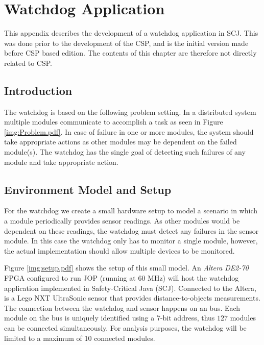 \chapter{Watchdog Application}
\label{appendix:WD}
This appendix describes the development of a watchdog application in SCJ. This was done prior to the development of the CSP, and is the initial version made before CSP based edition. The contents of this chapter are therefore not directly related to CSP.


\section{Introduction}
The watchdog is based on the following problem setting. In a distributed system multiple modules communicate to accomplish a task as seen in Figure \ref{img:Problem.pdf}. In case of failure in one or more modules, the system should take appropriate actions as other modules may be dependent on the failed module(s). The watchdog has the single goal of detecting such failures of any module and take appropriate action.


\section{Environment Model and Setup}
For the watchdog we create a small hardware setup to model a scenario in which a module periodically provides sensor readings. As other modules would be dependent on these readings, the watchdog must detect any failures in the sensor module. In this case the watchdog only has to monitor a single module, however, the actual implementation should allow multiple devices to be monitored.

Figure \ref{img:setup.pdf} shows the setup of this small model. An \textit{Altera DE2-70} FPGA configured to run JOP (running at 60 MHz) will host the watchdog application implemented in Safety-Critical Java (SCJ). Connected to the Altera, is a Lego NXT UltraSonic sensor that provides distance-to-objects measurements. The connection between the watchdog and sensor happens on an \iic bus. Each module on the bus is uniquely identified using a 7-bit address, thus $127$ modules can be connected simultaneously. For analysis purposes, the watchdog will be limited to a maximum of 10 connected modules.


